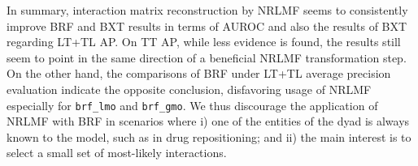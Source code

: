 





In summary, interaction matrix reconstruction by NRLMF seems to consistently improve BRF and BXT results in terms of AUROC and also the results of BXT regarding LT+TL AP. On TT AP, while less evidence is found, the results still seem to point in the same direction of a beneficial NRLMF transformation step. On the other hand, the comparisons of BRF under LT+TL average precision evaluation indicate the opposite conclusion, disfavoring usage of NRLMF especially for \texttt{brf\_lmo} and \texttt{brf\_gmo}. We thus discourage the application of NRLMF with BRF in scenarios where i) one of the entities of the dyad is always known to the model, such as in drug repositioning; and ii) the main interest is to select a small set of most-likely interactions.


% 

